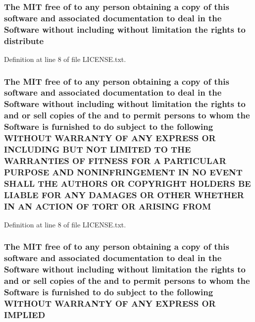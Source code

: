 \subsubsection[{\texorpdfstring{distribute}{distribute}}]{\setlength{\rightskip}{0pt plus 5cm}The M\+IT free of to any person obtaining a {\bf copy} of this software and associated documentation to deal in the {\bf Software} without including without limitation the rights to distribute}\hypertarget{LICENSE_8txt_ad8444ae07f9fa7b3e3e0cf4dc4551114}{}\label{LICENSE_8txt_ad8444ae07f9fa7b3e3e0cf4dc4551114}


Definition at line 8 of file L\+I\+C\+E\+N\+S\+E.\+txt.

\subsubsection[{\texorpdfstring{F\+R\+OM}{FROM}}]{\setlength{\rightskip}{0pt plus 5cm}The M\+IT free of to any person obtaining a {\bf copy} of this software and associated documentation to deal in the {\bf Software} without including without limitation the rights to and or sell copies of the and to permit persons to whom the {\bf Software} is furnished to do subject to the following W\+I\+T\+H\+O\+UT W\+A\+R\+R\+A\+N\+TY OF A\+NY E\+X\+P\+R\+E\+SS OR I\+N\+C\+L\+U\+D\+I\+NG B\+UT N\+OT L\+I\+M\+I\+T\+ED TO T\+HE W\+A\+R\+R\+A\+N\+T\+I\+ES OF F\+I\+T\+N\+E\+SS F\+OR A P\+A\+R\+T\+I\+C\+U\+L\+AR P\+U\+R\+P\+O\+SE A\+ND N\+O\+N\+I\+N\+F\+R\+I\+N\+G\+E\+M\+E\+NT IN NO E\+V\+E\+NT S\+H\+A\+LL T\+HE A\+U\+T\+H\+O\+RS OR C\+O\+P\+Y\+R\+I\+G\+HT H\+O\+L\+D\+E\+RS BE L\+I\+A\+B\+LE F\+OR A\+NY D\+A\+M\+A\+G\+ES OR O\+T\+H\+ER W\+H\+E\+T\+H\+ER IN AN A\+C\+T\+I\+ON OF T\+O\+RT OR A\+R\+I\+S\+I\+NG F\+R\+OM}\hypertarget{LICENSE_8txt_ac44d0f7742875ad0d1fc3a6de1ee0f7d}{}\label{LICENSE_8txt_ac44d0f7742875ad0d1fc3a6de1ee0f7d}


Definition at line 8 of file L\+I\+C\+E\+N\+S\+E.\+txt.

\subsubsection[{\texorpdfstring{I\+M\+P\+L\+I\+ED}{IMPLIED}}]{\setlength{\rightskip}{0pt plus 5cm}The M\+IT free of to any person obtaining a {\bf copy} of this software and associated documentation to deal in the {\bf Software} without including without limitation the rights to and or sell copies of the and to permit persons to whom the {\bf Software} is furnished to do subject to the following W\+I\+T\+H\+O\+UT W\+A\+R\+R\+A\+N\+TY OF A\+NY E\+X\+P\+R\+E\+SS OR I\+M\+P\+L\+I\+ED}\hypertarget{LICENSE_8txt_ab0624cdd79a1b72ae3e8cb7b147149da}{}\label{LICENSE_8txt_ab0624cdd79a1b72ae3e8cb7b147149da}


